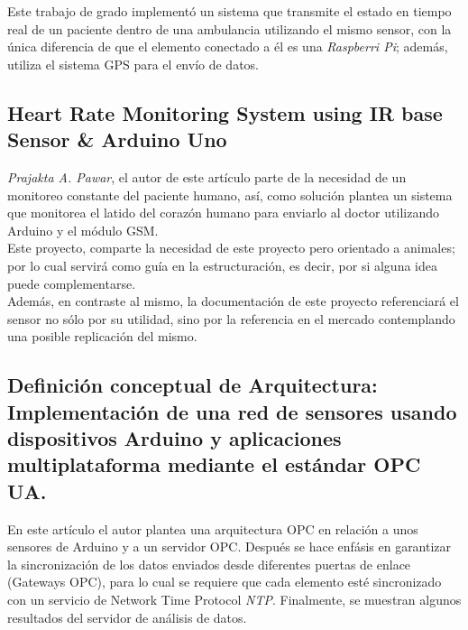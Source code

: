 \documentclass[letterpaper, 10 pt, conference]{ieeeconf}  %
\begin{document}

Este trabajo de grado implement\'o un sistema que transmite el estado en tiempo real de un paciente dentro de una ambulancia utilizando el mismo sensor, con la \'unica diferencia de que el elemento conectado a \'el es una \textit{Raspberri Pi}; adem\'as, utiliza el sistema GPS para el env\'io de datos.

\subsection{Heart Rate Monitoring System using IR base Sensor \& Arduino Uno  \cite{c7}}

\textit{Prajakta A. Pawar}, el autor de este art\'iculo parte de la necesidad de un monitoreo constante del paciente humano, as\'i, como soluci\'on plantea un sistema que monitorea el latido del coraz\'on humano para enviarlo al doctor utilizando Arduino y el m\'odulo GSM.\\

Este proyecto, comparte la necesidad de este proyecto pero orientado a animales; por lo cual servir\'a como gu\'ia en la estructuraci\'on, es decir, por si alguna idea puede complementarse.\\

Adem\'as, en contraste al mismo, la documentaci\'on de este proyecto referenciar\'a el sensor no s\'olo por su utilidad, sino por la referencia en el mercado contemplando una posible replicaci\'on del mismo.


\subsection{Definici\'on conceptual de Arquitectura: Implementaci\'on de una red de sensores usando dispositivos Arduino y aplicaciones multiplataforma mediante el est\'andar OPC UA. \cite{c1}}

En este art\'iculo el autor plantea una arquitectura OPC en relaci\'on a unos sensores de Arduino y a un servidor OPC. Despu\'es se hace enf\'asis en garantizar la sincronizaci\'on de los datos enviados desde diferentes puertas de enlace (Gateways OPC), para lo cual se requiere que cada elemento est\'e sincronizado con un servicio de Network Time Protocol \textit{NTP}. Finalmente, se muestran algunos resultados del servidor de an\'alisis de datos.\\
\end{document}
